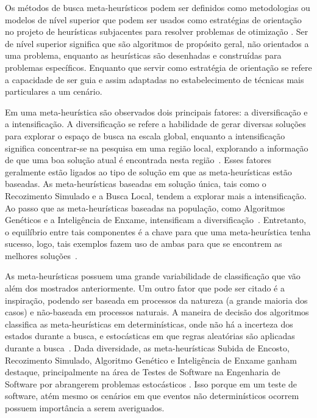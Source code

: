 Os métodos de busca meta-heurísticos podem ser definidos como metodologias ou modelos de nível superior que podem ser usados como estratégias de orientação no projeto de heurísticas subjacentes para resolver problemas de otimização \cite{talbi2009metaheuristics}. Ser de nível superior significa que são algoritmos de propósito geral, não orientados a uma problema, enquanto as heurísticas são desenhadas e construídas para  problemas específicos. Enquanto que servir como estratégia de orientação se refere a capacidade de ser guia e assim adaptadas no estabelecimento de técnicas mais particulares a um cenário.

Em uma meta-heurística são observados dois principais fatores: a diversificação e a intensificação. A diversificação se refere a habilidade de gerar diversas soluções para explorar o espaço de busca na escala global, enquanto a intensificação significa concentrar-se na pesquisa em uma região local, explorando a informação de que uma boa solução atual é encontrada nesta região~\cite{yang2014metaheuristic}. Esses fatores geralmente estão ligados ao tipo de solução em que as meta-heurísticas estão baseadas. As meta-heurísticas baseadas em solução única, tais como o Recozimento Simulado e a Busca Local, tendem a explorar mais a intensificação. Ao passo que as meta-heurísticas baseadas na população, como Algoritmos Genéticos e a Inteligência de Enxame, intensificam a diversificação~\cite{talbi2009metaheuristics}. Entretanto, o equilíbrio entre tais componentes é a chave para que uma meta-heurística tenha sucesso, logo, tais exemplos fazem uso de ambas para que se encontrem as melhores soluções~\cite{yang2014metaheuristic}.

As meta-heurísticas possuem uma grande variabilidade de classificação que vão além dos mostrados anteriormente. Um outro fator que pode ser citado é a inspiração, podendo ser baseada em processos da natureza (a grande maioria dos casos) e não-baseada em processos naturais. A maneira de decisão dos algoritmos classifica as meta-heurísticas em determinísticas, onde não há a incerteza dos estados durante a busca, e estocásticas em que regras aleatórias são aplicadas durante a busca~\cite{talbi2009metaheuristics}. Dada diversidade, as meta-heurísticas Subida de Encosto, Recozimento Simulado, Algoritmo Genético e Inteligência de Enxame ganham destaque, principalmente na área de Testes de Software na Engenharia de Software por abrangerem problemas estocásticos \cite{khari2017extensive}. Isso porque em um teste de software, atém mesmo os cenários em que eventos não determinísticos ocorrem possuem importância a serem averiguados. 


